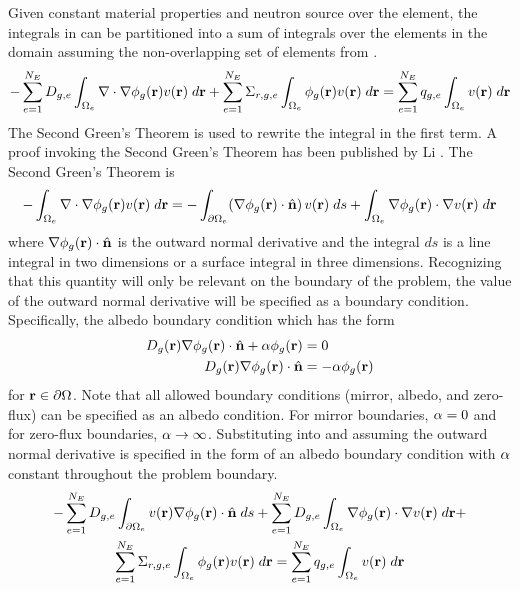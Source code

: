     Given constant material properties and neutron source over the element, 
    the integrals in  can be partitioned into a sum of 
    integrals over the elements in the domain assuming the non-overlapping set
    of elements from .
    \begin{equation} 
      \label{eq:element_by_element}
      -\sum_{e=1}^{N_E} D_{g,e} 
        \int_{\Omega_e} \mathbf{\nabla} \cdot \mathbf{\nabla} \phi_g(\mathbf{r}) v(\mathbf{r}) \; d\mathbf{r} +
        \sum_{e=1}^{N_E} \Sigma_{r,g,e} \int_{\Omega_e} \phi_g(\mathbf{r}) v(\mathbf{r}) 
        \;d\mathbf{r} = \sum_{e=1}^{N_E} q_{g,e} \int_{\Omega_e} v(\mathbf{r}) 
        \; d\mathbf{r}
    \end{equation}
    The Second Green's Theorem is used to rewrite the integral in the first
    term. A proof invoking the Second Green's Theorem has been published by Li
    \cite{textbookli}.%
    The Second 
    Green's Theorem is 
    \begin{equation} 
      \label{eq:greens}
      -\int_{\Omega_e} \mathbf{\nabla} \cdot \mathbf{\nabla} \phi_g(\mathbf{r}) v(\mathbf{r}) \;d\mathbf{r} =
        -\int_{\partial \Omega_e}  
        (\mathbf{\nabla} \phi_g(\mathbf{r}) \cdot \hat{\mathbf{n}}) \, v(\mathbf{r})\; ds +
        \int_{\Omega_e} \mathbf{\nabla} \phi_g(\mathbf{r}) \cdot \mathbf{\nabla} v(\mathbf{r}) \; d\mathbf{r}
    \end{equation}
    where $\mathbf{\nabla} \phi_g(\mathbf{r}) \cdot \hat{\mathbf{n}}$ is the outward normal 
    derivative and the integral $ds$ is a line integral in two dimensions or a 
    surface integral in three dimensions. Recognizing that this quantity will
    only be relevant on the boundary of the problem, the value of the outward
    normal derivative will be specified as a boundary condition. Specifically,
    the albedo boundary condition which has the form 
    \begin{align}
      D_g(\mathbf{r}) \mathbf{\nabla} \phi_g(\mathbf{r}) \cdot \hat{\mathbf{n}} + \alpha \phi_g(\mathbf{r}) &= 0 \\
      D_g(\mathbf{r}) \mathbf{\nabla} \phi_g(\mathbf{r}) \cdot \hat{\mathbf{n}} &= -\alpha \phi_g(\mathbf{r})
    \end{align}
    for $\mathbf{r} \in \partial \Omega$. Note that all allowed boundary conditions
    (mirror, albedo, and zero-flux) can be specified as an albedo condition. For
    mirror boundaries, $\alpha = 0$ and for zero-flux boundaries, $\alpha
    \rightarrow \infty$.
    Substituting  into   and 
    assuming the outward normal derivative is specified in the form of an albedo
    boundary condition with $\alpha$ constant throughout the problem boundary.
    \begin{multline} 
      -\sum_{e=1}^{N_E} D_{g,e} \int_{\partial \Omega_e} v(\mathbf{r}) \mathbf{\nabla}
      \phi_g(\mathbf{r}) \cdot \hat{\mathbf{n}} \;ds + \sum_{e=1}^{N_E} 
        D_{g,e} \int_{\Omega_e} \mathbf{\nabla} \phi_g(\mathbf{r}) \cdot \mathbf{\nabla} v(\mathbf{r}) 
        \; d\mathbf{r} + \\
        \sum_{e=1}^{N_E} \Sigma_{r,g,e} \int_{\Omega_e} \phi_g(\mathbf{r}) v(\mathbf{r}) 
        \; d\mathbf{r} =
        \sum_{e=1}^{N_E} q_{g,e} \int_{\Omega_e} v(\mathbf{r}) \; d\mathbf{r}
    \end{multline}
